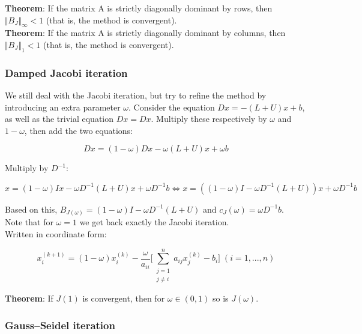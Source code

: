 \documentclass[margin=0px]{article}
\begin{document}
\noindent \textbf{Theorem}: If the matrix A is strictly diagonally dominant by rows, then
$\Vert B_{J} \Vert_{\infty} < 1$ (that is, the method is convergent).\\

\noindent \textbf{Theorem}: If the matrix A is strictly diagonally dominant by columns, then
$\Vert B_{J} \Vert_{1} < 1$ (that is, the method is convergent).

\subsubsection{Damped Jacobi iteration}

We still deal with the Jacobi iteration, but try to refine the method by introducing an extra parameter $\omega$.
Consider the equation $Dx = -(L + U)x + b$, as well as the trivial equation $Dx =
    Dx$. Multiply these respectively by $\omega$ and $1 - \omega$, then add the two
equations:

\begin{displaymath}
    Dx = (1 - \omega)Dx -\omega(L+U)x + \omega b
\end{displaymath}

\noindent Multiply by $D^{-1}$:

\begin{displaymath}
    x = (1 - \omega)Ix -\omega D^{-1}(L+U)x + \omega D^{-1}b \Longleftrightarrow
    x = ((1 - \omega)I -\omega D^{-1}(L+U))x + \omega D^{-1}b
\end{displaymath}

\noindent Based on this, $B_{J(\omega)} = (1 - \omega)I -\omega D^{-1}(L+U)$ and $c_{J}(\omega) = \omega D^{-1}b$.\\

\noindent Note that for $\omega = 1$ we get back exactly the Jacobi iteration.\\

\noindent Written in coordinate form:

\begin{displaymath}
    x^{(k+1)}_{i} =
    (1 - \omega)x^{(k)}_{i}
    -\frac{\omega}{a_{ii}}
    \Bigg[
    \sum_{\substack{j=1\\ j \not = i}}^{n} a_{ij}x_{j}^{(k)} - b_{i}
    \Bigg]
    \; (i = 1, ..., n)
\end{displaymath}

\noindent \textbf{Theorem}: If $J(1)$ is convergent, then for $\omega \in (0,1)$ so is $J(\omega)$.

\subsubsection{Gauss--Seidel iteration}
\end{document}
